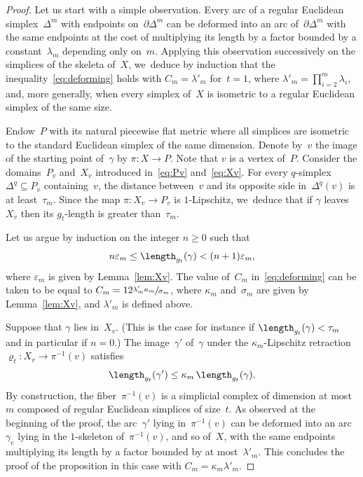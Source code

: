 \begin{proof}
Let us start with a simple observation.
Every arc of a regular Euclidean simplex~$\Delta^m$ with endpoints on~$\partial \Delta^m$ can be deformed into an arc of~$\partial \Delta^m$ with the same endpoints at the cost of multiplying its length by a factor bounded by a constant~$\lambda_m$ depending only on~$m$.
Applying this observation successively on the simplices of the skeleta of~$X$, we~deduce by induction that the inequality~\eqref{eq:deforming} holds with $C_m = \lambda'_m$ for~$t=1$, where $\lambda'_m = \prod_{i=2}^m \lambda_i$, and, more generally, when every simplex of~$X$ is isometric to a regular Euclidean simplex of the same size.

Endow~$P$ with its natural piecewise flat metric where all simplices are isometric to the standard Euclidean simplex of the same dimension.
Denote by~$v$ the image of the starting point of~$\gamma$ by $\pi:X \to P$.
Note that $v$ is a vertex of~$P$.
Consider the domains~$P_v$ and~$X_v$ introduced in~\eqref{eq:Pv} and~\eqref{eq:Xv}.
For every $q$-simplex $\Delta^q \subseteq P_v$ containing~$v$, the distance between~$v$ and its opposite side in~$\Delta^q(v)$ is at least~$\tau_m$.
Since the map $\pi:X_v \to P_v$ is $1$-Lipschitz, we~deduce that if $\gamma$ leaves~$X_v$ then its $g_t$-length is greater than~$\tau_m$.

Let us argue by induction on the integer $n \geq 0$ such that
\[
n \varepsilon_m \leq \length_{g_t}(\gamma) < (n+1) \varepsilon_m,
\]
where $\varepsilon_m$ is given by Lemma~\ref{lem:Xv}.
The value of~$C_m$ in~\eqref{eq:deforming} can be taken to be equal to
$
C_m = 12 \sfrac{\lambda'_m \kappa_m}{\sigma_m}
$,
where $\kappa_m$ and~$\sigma_m$ are given by Lemma~\ref{lem:Xv}, and $\lambda'_m$ is defined above.

Suppose that $\gamma$ lies in~$X_v$.
(This is the case for instance if $\length_{g_t}(\gamma) < \tau_m$ and in particular if $n=0$.)
The image~$\gamma'$ of~$\gamma$ under the $\kappa_m$-Lipschitz retraction $\varrho_t:X_v \to \pi^{-1}(v)$ satisfies
\[
\length_{g_t}(\gamma') \leq \kappa_m \, \length_{g_t}(\gamma).
\]
By construction, the fiber~$\pi^{-1}(v)$ is a simplicial complex of dimension at most~$m$ composed of regular Euclidean simplices of size~$t$.
As observed at the beginning of the proof, the arc~$\gamma'$ lying in~$\pi^{-1}(v)$ can be deformed into an arc~$\gamma_e$ lying in the $1$-skeleton of~$\pi^{-1}(v)$, and so of~$X$, with the same endpoints multiplying its length by a factor bounded by at most~$\lambda'_m$.
This concludes the proof of the proposition in this case with $C_m=\kappa_m \lambda'_m$.


\end{proof}
